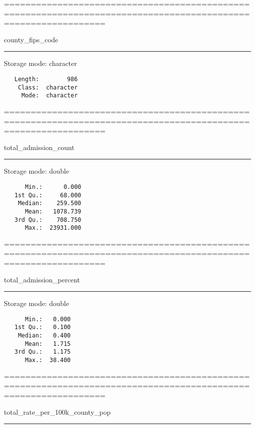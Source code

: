 \documentclass[]{article}
\begin{document}
===============================================================================================================

county\_fips\_code

\begin{center}\rule{0.5\linewidth}{\linethickness}\end{center}

Storage mode: character

\begin{verbatim}
   Length:        986  
    Class:  character  
     Mode:  character  
\end{verbatim}

===============================================================================================================

total\_admission\_count

\begin{center}\rule{0.5\linewidth}{\linethickness}\end{center}

Storage mode: double

\begin{verbatim}
      Min.:      0.000  
   1st Qu.:     68.000  
    Median:    259.500  
      Mean:   1078.739  
   3rd Qu.:    708.750  
      Max.:  23931.000  
\end{verbatim}

===============================================================================================================

total\_admission\_percent

\begin{center}\rule{0.5\linewidth}{\linethickness}\end{center}

Storage mode: double

\begin{verbatim}
      Min.:   0.000  
   1st Qu.:   0.100  
    Median:   0.400  
      Mean:   1.715  
   3rd Qu.:   1.175  
      Max.:  38.400  
\end{verbatim}

===============================================================================================================

total\_rate\_per\_100k\_county\_pop

\begin{center}\rule{0.5\linewidth}{\linethickness}\end{center}
\end{document}
